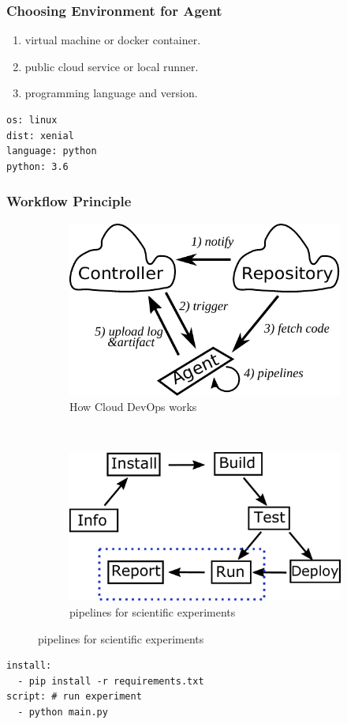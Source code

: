 \documentclass[notheorems]{beamer}
\begin{document}
\begin{frame}[fragile]
\frametitle{Choosing Environment for Agent}
\begin{enumerate}
\item virtual machine or docker container.
\item public cloud service or local runner.
\item programming language and version.
\end{enumerate}

\begin{lstlisting}[caption={environment configuration}, captionpos=b]
os: linux
dist: xenial
language: python
python: 3.6
\end{lstlisting}
\end{frame}

\begin{frame}[fragile]
\frametitle{Workflow Principle}
\begin{figure}
\centering
\begin{subfigure}{0.4\textwidth}
\includegraphics[width=\textwidth]{../principal.pdf}
\caption{How Cloud DevOps works}
\end{subfigure}~
\begin{subfigure}{0.4\textwidth}
\includegraphics[width=\textwidth]{../workflow.pdf}
\caption{pipelines for scientific experiments}
\end{subfigure}
\end{figure}

\begin{lstlisting}[caption={workflow description}, label={lst:wd}, captionpos=b]
install: 
  - pip install -r requirements.txt
script: # run experiment
  - python main.py
\end{lstlisting}

\end{frame}
\end{document}
